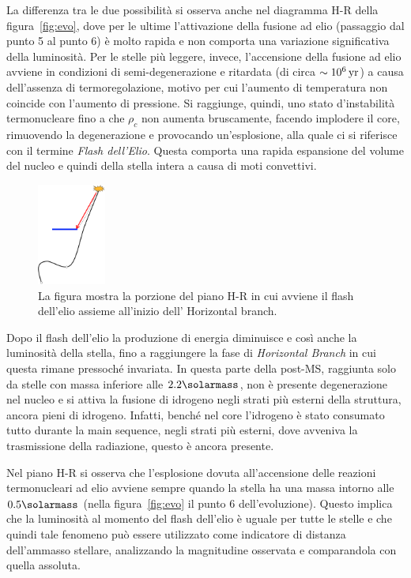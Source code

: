 La differenza tra le due possibilità si osserva anche nel diagramma H-R della figura~\ref{fig:evo}, dove per le ultime l'attivazione della fusione ad elio (passaggio dal punto 5 al punto 6) è molto rapida e non comporta una variazione significativa della luminosità. Per le stelle più leggere, invece, l'accensione della fusione ad elio avviene in condizioni di semi-degenerazione e ritardata (di circa $\sim 10^6 \, \textup{yr}$) a causa dell'assenza di termoregolazione, motivo per cui l'aumento di temperatura non coincide con l'aumento di pressione. Si raggiunge, quindi, uno stato d'instabilità termonucleare fino a che $\rho_c$ non aumenta bruscamente, facendo implodere il core, rimuovendo la degenerazione e provocando un'esplosione, alla quale ci si riferisce con il termine \emph{Flash dell'Elio}. Questa comporta una rapida espansione del volume del nucleo e quindi della stella intera a causa di moti convettivi.
\begin{figure}
    \centering
    \includegraphics[width = 0.2\textwidth]{immagini/he_flash.png}
    \caption{La figura mostra la porzione del piano H-R in cui avviene il flash dell'elio assieme all'inizio dell' Horizontal branch.}\label{fig:flash-he}
\end{figure}

Dopo il flash dell'elio la produzione di energia diminuisce e così anche la luminosità della stella, fino a raggiungere la fase di \emph{Horizontal Branch} in cui questa rimane pressoché invariata. In questa parte della post-MS, raggiunta solo da stelle con massa inferiore alle $2.2 \si{\solarmass}$, non è presente degenerazione nel nucleo e si attiva la fusione di idrogeno negli strati più esterni della struttura, ancora pieni di idrogeno. Infatti, benché nel core l'idrogeno è stato consumato tutto durante la main sequence, negli strati più esterni, dove avveniva la trasmissione della radiazione, questo è ancora presente.

Nel piano H-R si osserva che l'esplosione dovuta all'accensione delle reazioni termonucleari ad elio avviene sempre quando la stella ha una massa intorno alle $0.5 \si{\solarmass}$ (nella figura~\ref{fig:evo} il punto 6 dell'evoluzione). Questo implica che la luminosità al momento del flash dell'elio è uguale per tutte le stelle e che quindi tale fenomeno può essere utilizzato come indicatore di distanza dell'ammasso stellare, analizzando la magnitudine osservata e comparandola con quella assoluta.

